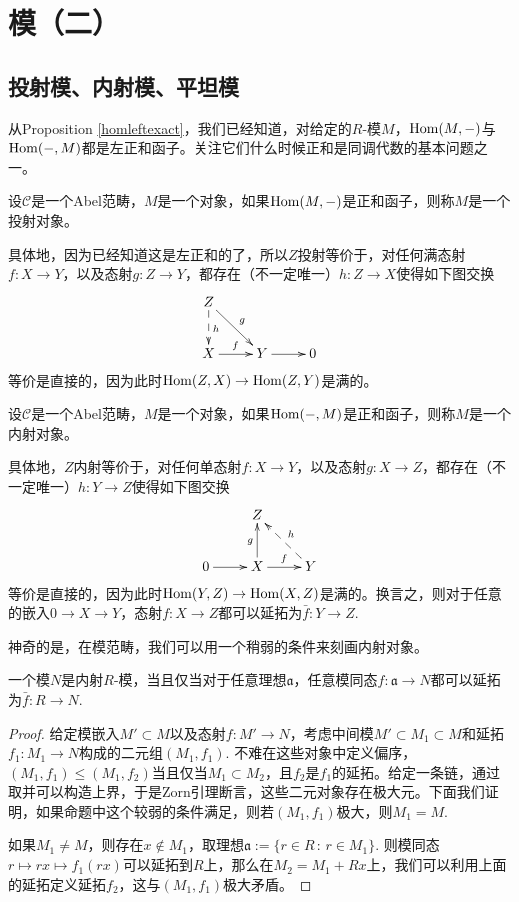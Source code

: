 \chapter{模（二）}

\section{投射模、内射模、平坦模}

从Proposition \ref{homleftexact}，我们已经知道，对给定的$R$-模$M$，$\operatorname{Hom}(M,-)$与$\operatorname{Hom}(-,M)$都是左正和函子。关注它们什么时候正和是同调代数的基本问题之一。

\begin{para}[投射对象]
	设$\mathcal C$是一个Abel范畴，$M$是一个对象，如果$\operatorname{Hom}(M,-)$是正和函子，则称$M$是一个投射对象。
\end{para}

具体地，因为已经知道这是左正和的了，所以$Z$投射等价于，对任何满态射$f:X\to Y$，以及态射$g:Z\to Y$，都存在（不一定唯一）$h:Z\to X$使得如下图交换
\[
	\xymatrix{
Z \ar@{->}[rd]^g \ar@{-->}[d]^h &  &  \\
X \ar@{->}[r]^f & Y \ar@{->}[r] & 0
}
\]
等价是直接的，因为此时$\operatorname{Hom}(Z,X)\to \operatorname{Hom}(Z,Y)$是满的。

\begin{para}[内射对象]
	设$\mathcal C$是一个Abel范畴，$M$是一个对象，如果$\operatorname{Hom}(-,M)$是正和函子，则称$M$是一个内射对象。
\end{para}

具体地，$Z$内射等价于，对任何单态射$f:X\to Y$，以及态射$g:X\to Z$，都存在（不一定唯一）$h:Y\to Z$使得如下图交换
\[
	\xymatrix{
 &  Z & \\
0 \ar@{->}[r] & X \ar@{->}[r]^f \ar[u]^g & Y \ar@{-->}[ul]_h
}
\]
等价是直接的，因为此时$\operatorname{Hom}(Y,Z)\to \operatorname{Hom}(X,Z)$是满的。换言之，则对于任意的嵌入$0\to X\to Y$，态射$f:X\to Z$都可以延拓为$\bar f:Y\to Z$.

神奇的是，在模范畴，我们可以用一个稍弱的条件来刻画内射对象。

\begin{pro}
	一个模$N$是内射$R$-模，当且仅当对于任意理想$\mathfrak a$，任意模同态$f:\mathfrak a\to N$都可以延拓为$\bar f:R\to N$.
\end{pro}

\begin{proof}
给定模嵌入$M'\subset M$以及态射$f:M'\to N$，考虑中间模$M'\subset M_1\subset M$和延拓$f_1:M_1\to N$构成的二元组$(M_1,f_1)$. 不难在这些对象中定义偏序，$(M_1,f_1)\leq (M_1,f_2)$当且仅当$M_1\subset M_2$，且$f_2$是$f_1$的延拓。给定一条链，通过取并可以构造上界，于是Zorn引理断言，这些二元对象存在极大元。下面我们证明，如果命题中这个较弱的条件满足，则若$(M_1,f_1)$极大，则$M_1=M$.

如果$M_1\neq M$，则存在$x\not\in M_1$，取理想$\mathfrak a:=\{r\in R\,:\,r\in M_1\}$. 则模同态$r\mapsto rx \mapsto f_1(rx)$可以延拓到$R$上，那么在$M_2=M_1+Rx$上，我们可以利用上面的延拓定义延拓$f_2$，这与$(M_1,f_1)$极大矛盾。
\end{proof}

